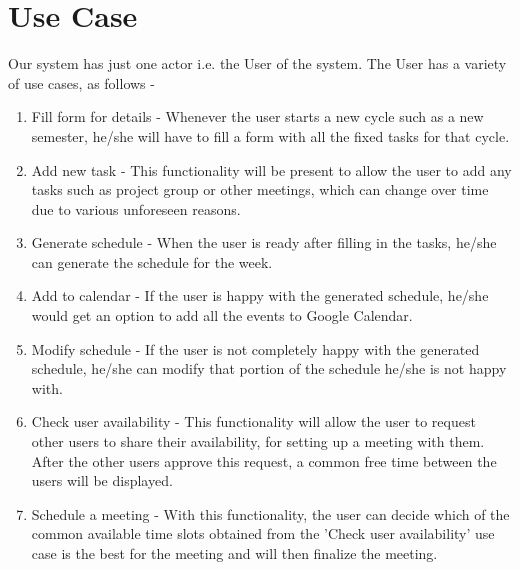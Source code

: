 \documentclass{sig-alternate-05-2015}
\begin{document}
\section{Use Case}
Our system has just one actor i.e. the User of the system. The User has a variety of use cases, as follows - 
\begin{enumerate}
\item Fill form for details - Whenever the user starts a new cycle such as a new semester, he/she will have to fill a form with all the fixed tasks for that cycle.
\item Add new task - This functionality will be present to allow the user to add any tasks such as project group or other meetings, which can change over time due to various unforeseen reasons.
\item Generate schedule - When the user is ready after filling in the tasks, he/she can generate the schedule for the week.
\item Add to calendar - If the user is happy with the generated schedule, he/she would get an option to add all the events to Google Calendar.
\item Modify schedule - If the user is not completely happy with the generated schedule, he/she can modify that portion of the schedule he/she is not happy with.
\item Check user availability - This functionality will allow the user to request other users to share their availability, for setting up a meeting with them. After the other users approve this request, a common free time between the users will be displayed.
\item Schedule a meeting - With this functionality, the user can decide which of the common available time slots obtained from the 'Check user availability' use case is the best for the meeting and will then finalize the meeting.
\end{enumerate}
\end{document}

